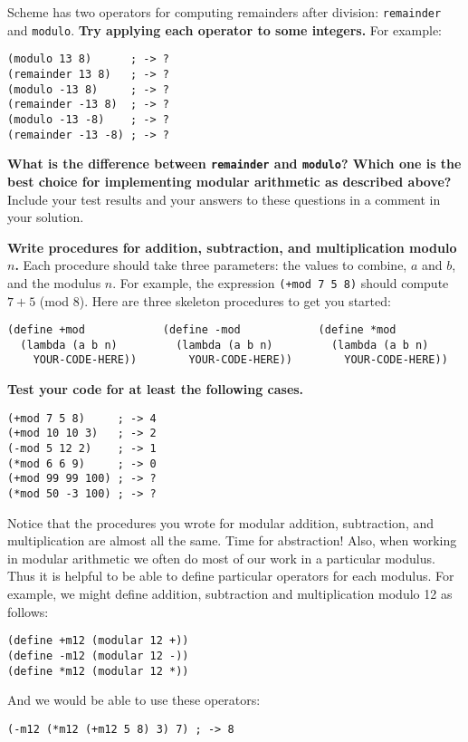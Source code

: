 Scheme has two operators for computing remainders after
division: {\tt remainder} and {\tt modulo}.  {\bf Try applying each
operator to some integers.}  For example:
\begin{verbatim}
(modulo 13 8)      ; -> ?
(remainder 13 8)   ; -> ?
(modulo -13 8)     ; -> ?
(remainder -13 8)  ; -> ?
(modulo -13 -8)    ; -> ?
(remainder -13 -8) ; -> ?
\end{verbatim}
{\bf What is the difference between {\tt remainder} and {\tt modulo}?
Which one is the best choice for implementing modular arithmetic as
described above?}  Include your test results and your answers
to these questions in a comment in your solution.

{\bf Write procedures for addition, subtraction, and multiplication modulo
$n$.}  Each procedure should take three parameters: the values to
combine, $a$ and $b$, and the modulus $n$.  For example, the
expression {\tt (+mod 7 5 8)} should compute $7+5$ (mod 8).  Here are 
three skeleton procedures to get you started:
\begin{verbatim}
(define +mod            (define -mod            (define *mod
  (lambda (a b n)         (lambda (a b n)         (lambda (a b n)
    YOUR-CODE-HERE))        YOUR-CODE-HERE))        YOUR-CODE-HERE))
\end{verbatim}


{\bf Test your code for at least the following cases.}

\begin{verbatim}
(+mod 7 5 8)     ; -> 4
(+mod 10 10 3)   ; -> 2
(-mod 5 12 2)    ; -> 1
(*mod 6 6 9)     ; -> 0
(+mod 99 99 100) ; -> ?
(*mod 50 -3 100) ; -> ?
\end{verbatim}

Notice that the procedures you wrote for modular addition, subtraction, and
multiplication are almost all the same.  Time for abstraction!  Also,
when working in modular arithmetic we often do most of our work in a
particular modulus.  Thus it is helpful to be able to define
particular operators for each modulus.  For example, we might define
addition, subtraction and multiplication modulo 12 as follows:
\begin{verbatim}
(define +m12 (modular 12 +))
(define -m12 (modular 12 -))
(define *m12 (modular 12 *))
\end{verbatim}
And we would be able to use these operators:
\begin{verbatim}
(-m12 (*m12 (+m12 5 8) 3) 7) ; -> 8
\end{verbatim}

